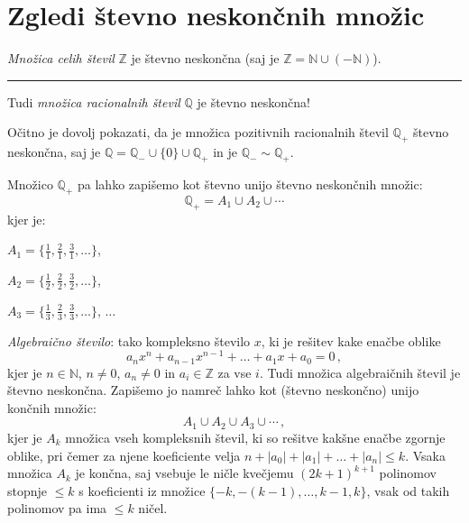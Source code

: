 \documentclass[11pt,paper=b5,footinclude,headinclude]{scrbook} %
\begin{document}
\section{Zgledi števno neskončnih množic}

\bigskip
{\em Množica celih števil} $\mathbb{Z}$ je števno neskončna (saj je $\mathbb{Z} = \mathbb{N}\cup (-\mathbb{N})$).

\bigskip
\hrule
\bigskip

Tudi {\em množica racionalnih števil} $\mathbb{Q}$ je števno neskončna!

Očitno je dovolj pokazati, da je množica pozitivnih racionalnih števil $\mathbb{Q}_+$
 števno neskončna, saj je $\mathbb{Q} = \mathbb{Q}_-\cup \{0\}\cup \mathbb{Q}_+$ in je
$\mathbb{Q}_-\sim \mathbb{Q}_+$.

Množico $\mathbb{Q}_+$ pa lahko zapišemo kot števno unijo števno neskončnih množic:
$$\mathbb{Q}_+ = A_1\cup A_2\cup \cdots$$
kjer je:

$A_1 = \{\frac{1}{1}, \frac{2}{1}, \frac{3}{1}, \ldots\}$,

$A_2 = \{\frac{1}{2}, \frac{2}{2}, \frac{3}{2}, \ldots\}$,

$A_3 = \{\frac{1}{3}, \frac{2}{3}, \frac{3}{3}, \ldots\}$, $\ldots$


{\em Algebraično število}: tako kompleksno število $x$, ki je rešitev kake enačbe oblike
$$a_nx^n+a_{n-1}x^{n-1}+\ldots+a_1x+a_0 = 0\,,$$
kjer je $n\in \mathbb{N}$, $n\neq 0$, $a_n\neq 0$ in $a_i\in \mathbb{Z}$ za vse $i$.
Tudi množica algebraičnih števil je števno neskončna. Zapišemo jo namreč lahko kot
(števno neskončno) unijo končnih množic:
$$A_1\cup A_2\cup A_3\cup \cdots\,,$$
kjer je $A_k$ množica vseh kompleksnih števil, ki so rešitve
kakšne enačbe zgornje oblike, pri čemer za njene koeficiente velja
$n+|a_0|+|a_1|+\ldots+|a_n|\le k$.
Vsaka množica $A_k$ je končna, saj vsebuje le ničle kvečjemu
$(2k+1)^{k+1}$ polinomov stopnje $\le k$ s koeficienti iz množice $\{-k,-(k-1), \ldots, k-1,k\}$, vsak od takih polinomov pa ima
$\le k$ ničel.



%
%
\end{document}

